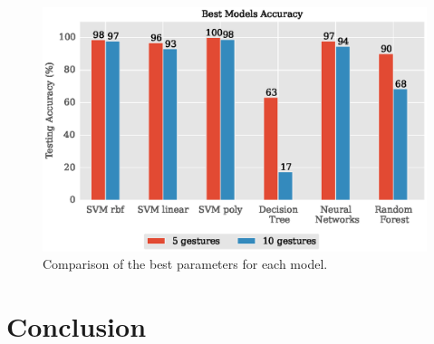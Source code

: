 \documentclass{article}
\begin{document}
\begin{figure}[th]
\vskip 0.1in
\begin{center}
\centerline{\includegraphics[width=\columnwidth]{allModels_comparison.eps}}
\caption{Comparison of the best parameters for each model.}
\label{fig:allModels_comparison}
\end{center}
\vskip -0.2in
\end{figure}

\section{Conclusion}



\end{document}
